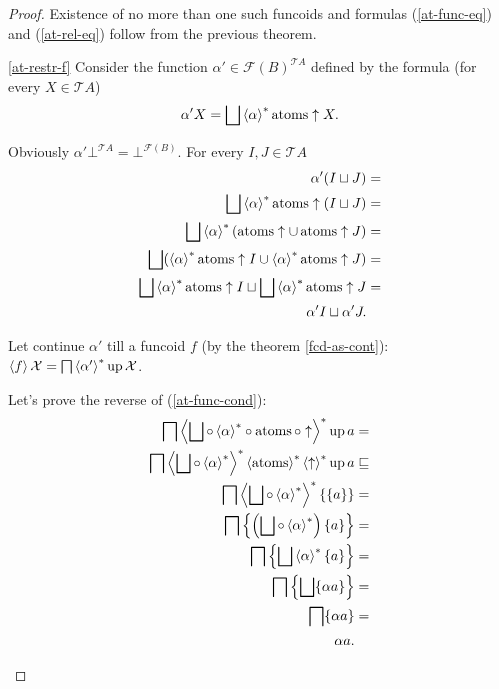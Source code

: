 \begin{proof}
Existence of no more than one such funcoids and formulas (\ref{at-func-eq})
and (\ref{at-rel-eq}) follow from the previous theorem.
\begin{widedisorder}
\item [{\ref{at-restr-f}}] Consider the function
$\alpha'\in\mathscr{F}(B)^{\mathscr{T}A}$
defined by the formula (for every $X\in\mathscr{T}A$)
\[
\alpha'X=\bigsqcup\rsupfun{\alpha}\atoms\uparrow X.
\]



Obviously $\alpha'\bot^{\mathscr{T}A}=\bot^{\mathscr{F}(B)}$. For
every $I,J\in\mathscr{T}A$
\begin{align*}
\alpha'(I\sqcup J) & =\\
\bigsqcup\rsupfun{\alpha}\atoms\uparrow(I\sqcup J) & =\\
\bigsqcup\rsupfun{\alpha}(\atoms\uparrow\cup\atoms\uparrow J) & =\\
\bigsqcup(\rsupfun{\alpha}\atoms\uparrow I\cup\rsupfun{\alpha}\atoms\uparrow J)
& =\\
\bigsqcup\rsupfun{\alpha}\atoms\uparrow
I\sqcup\bigsqcup\rsupfun{\alpha}\atoms\uparrow J & =\\
\alpha'I\sqcup\alpha'J.
\end{align*}



Let continue $\alpha'$ till a funcoid $f$ (by the theorem \ref{fcd-as-cont}):
$\left\langle f\right\rangle\mathcal{X}=\bigsqcap\left\langle \alpha'\right\rangle ^{\ast}\operatorname{up}\mathcal{X}$.


Let's prove the reverse of (\ref{at-func-cond}):
\begin{align*}
\bigsqcap\rsupfun{\bigsqcup\circ\rsupfun{\alpha}\circ\atoms\circ\uparrow}\up a &
=\\
\bigsqcap\rsupfun{\bigsqcup\circ\rsupfun{\alpha}}\rsupfun{\atoms}\rsupfun{
\uparrow}\up a & \sqsubseteq\\
\bigsqcap\rsupfun{\bigsqcup\circ\rsupfun{\alpha}}\{\{a\}\} & =\\
\bigsqcap\left\{ \left(\bigsqcup\circ\rsupfun{\alpha}\right)\{a\}\right\}  & =\\
\bigsqcap\left\{ \bigsqcup\rsupfun{\alpha}\{a\}\right\}  & =\\
\bigsqcap\left\{ \bigsqcup\{\alpha a\}\right\}  & =\\
\bigsqcap\{\alpha a\}  & =\\
\alpha a.
\end{align*}




\end{widedisorder}
\end{proof}
